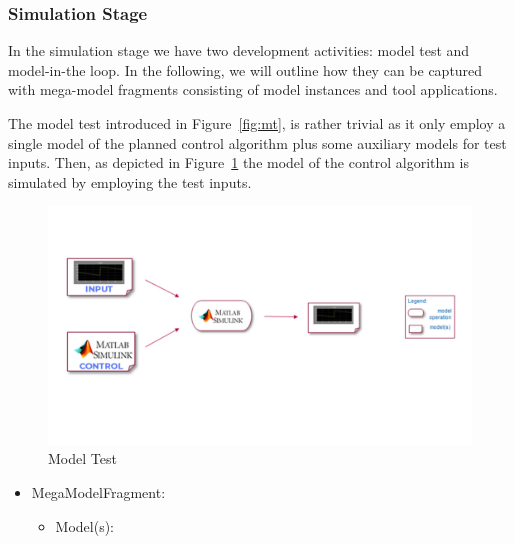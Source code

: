 \subsubsection{Simulation Stage}
%
In the simulation stage we have two development activities: model test and model-in-the loop.
%
In the following, we will outline how they can be captured with mega-model fragments consisting of model instances and tool applications.





%
The model test introduced in Figure~\ref{fig:mt}, is rather trivial as it only employ a single model of the planned control algorithm plus some auxiliary models for test inputs. Then, as depicted in Figure~\ref{fig:MMFig3} the model of the control algorithm is simulated by employing the test inputs.

\begin{figure}[!htb]
\centering
\includegraphics[width = \textwidth]{figures/mm-hpi3.pdf}
\caption{Model Test}
\label{fig:MMFig3}
\vspace{-0.2in}
\end{figure}

%
%

\begin{itemize}
    \item MegaModelFragment: \CPSLabMTMMF
    \begin{itemize}
        \item Model(s): \CPSLabControlModel
    \end{itemize}
\end{itemize}

